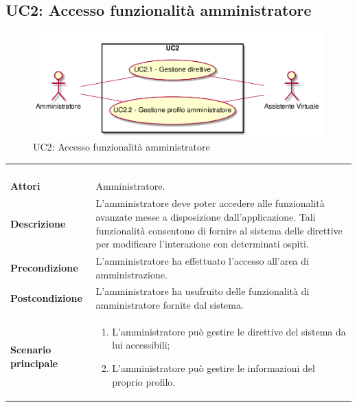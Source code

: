 \newpage\subsection{UC2: Accesso funzionalità amministratore}
\label{UC2}
\begin{figure}[h]
\centering
\includegraphics[width=\textwidth,height=\textheight,keepaspectratio]{images/UseCaseUC2.png}
\caption{UC2: Accesso funzionalità amministratore}
\end{figure}
\begin{longtable}{l|p{10cm}}
\rowcolor[gray]{0.8} \multicolumn{2}{c}{} \\
\rowcolor[gray]{0.8} \multicolumn{2}{c}{\textbf{UC2 - Accesso funzionalità amministratore}} \\
\rowcolor[gray]{0.8} \multicolumn{2}{c}{} \\
\hline
&\\
\textbf{Attori} & Amministratore.\\[7pt]
\textbf{Descrizione} & L'amministratore deve poter accedere alle funzionalità avanzate messe a disposizione dall'applicazione. Tali funzionalità consentono di fornire al sistema delle direttive per modificare l'interazione con determinati ospiti.\\[7pt]
\textbf{Precondizione} & L'amministratore ha effettuato l'accesso all'area di amministrazione.\\[7pt]
\textbf{Postcondizione} & L'amministratore ha usufruito delle funzionalità di amministratore fornite dal sistema.\\[7pt]
\textbf{Scenario principale} &\begin{enumerate}
\item  L'amministratore può gestire le direttive del sistema da lui accessibili;
\item  L'amministratore può gestire le informazioni del proprio profilo.
\end{enumerate}
\\[7pt]\hline
\end{longtable}

